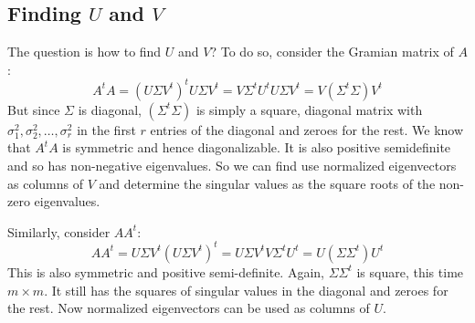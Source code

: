 \documentclass[12pt, a4paper]{article}
\numberwithin{equation}{section}
\begin{document}
\subsection{Finding $U$ and $V$}
The question is how to find $U$ and $V$? To do so, consider the Gramian matrix of $A$:
\begin{equation}
A^t A=(U\Sigma V^t)^t U\Sigma V^t=V\Sigma^t U^t U\Sigma V^t=V(\Sigma^t\Sigma)V^t
\end{equation}
But since $\Sigma$ is diagonal, $(\Sigma^t\Sigma)$ is simply a square, diagonal matrix with $\sigma_1^2,\sigma_2^2,\ldots,\sigma_r^2$ in the first $r$ entries of the diagonal and zeroes for the rest. We know that $A^t A$ is symmetric and hence diagonalizable. It is also positive semidefinite and so has non-negative eigenvalues. So we can find use normalized eigenvectors as columns of $V$ and determine the singular values as the square roots of the non-zero eigenvalues.

Similarly, consider $AA^t$:
\begin{equation}
AA^t=U\Sigma V^t(U\Sigma V^t)^t=U\Sigma V^t V\Sigma^t U^t=U(\Sigma\Sigma^t)U^t
\end{equation}
This is also symmetric and positive semi-definite. Again, $\Sigma\Sigma^t$ is square, this time $m\times m$. It still has the squares of singular values in the diagonal and zeroes for the rest. Now normalized eigenvectors can be used as columns of $U$.
\end{document}
